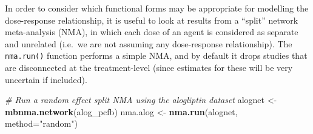 \documentclass[]{article}
\newenvironment{Shaded}{\begin{snugshade}}{\end{snugshade}}
\newcommand{\CommentTok}[1]{\textcolor[rgb]{0.56,0.35,0.01}{\textit{#1}}}
\newcommand{\DataTypeTok}[1]{\textcolor[rgb]{0.13,0.29,0.53}{#1}}
\newcommand{\KeywordTok}[1]{\textcolor[rgb]{0.13,0.29,0.53}{\textbf{#1}}}
\newcommand{\NormalTok}[1]{#1}
\newcommand{\StringTok}[1]{\textcolor[rgb]{0.31,0.60,0.02}{#1}}
\begin{document}
In order to consider which functional forms may be appropriate for
modelling the dose-response relationship, it is useful to look at
results from a ``split'' network meta-analysis (NMA), in which each dose
of an agent is considered as separate and unrelated (i.e.~we are not
assuming any dose-response relationship). The \texttt{nma.run()}
function performs a simple NMA, and by default it drops studies that are
disconnected at the treatment-level (since estimates for these will be
very uncertain if included).

\begin{Shaded}
\begin{Highlighting}[]
\CommentTok{# Run a random effect split NMA using the alogliptin dataset}
\NormalTok{alognet <-}\StringTok{ }\KeywordTok{mbnma.network}\NormalTok{(alog_pcfb)}
\NormalTok{nma.alog <-}\StringTok{ }\KeywordTok{nma.run}\NormalTok{(alognet, }\DataTypeTok{method=}\StringTok{"random"}\NormalTok{)}
\end{Highlighting}
\end{Shaded}
\end{document}
